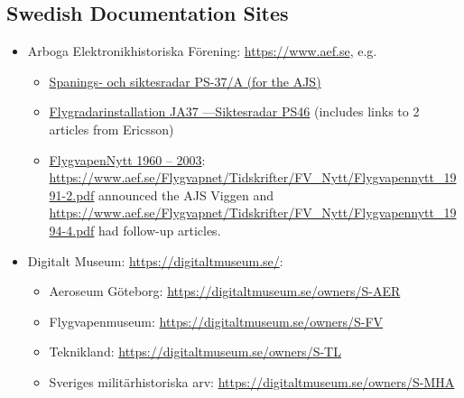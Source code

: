 \documentclass[a4paper]{report}
\begin{document}
\subsection{Swedish Documentation Sites}
\begin{itemize}
\item Arboga Elektronikhistoriska Förening: \url{https://www.aef.se}, e.g. 
\begin{itemize}
\item \href{https://www.aef.se/Avionik/Notiser/PS-37/PS-37A.htm}{Spanings- och siktesradar PS-37/A (for the AJS)}
\item \href{https://www.aef.se/Avionik/Notiser/Siktesradar_PS-46_1.htm}{Flygradarinstallation JA37 ---Siktesradar PS46} (includes links to 2 articles from Ericsson)
\item \href{https://www.aef.se/Flygvapnet/Tidskrifter/FV_Nytt/FVN_oversikt.htm}{FlygvapenNytt 1960 – 2003}: \url{https://www.aef.se/Flygvapnet/Tidskrifter/FV_Nytt/Flygvapennytt_1991-2.pdf} announced the AJS Viggen and \url{https://www.aef.se/Flygvapnet/Tidskrifter/FV_Nytt/Flygvapennytt_1994-4.pdf} had follow-up articles.
\end{itemize}
\item Digitalt Museum: \url{https://digitaltmuseum.se/}:
\begin{itemize}
\item Aeroseum Göteborg: \url{https://digitaltmuseum.se/owners/S-AER}
\item Flygvapenmuseum: \url{https://digitaltmuseum.se/owners/S-FV}
\item Teknikland: \url{https://digitaltmuseum.se/owners/S-TL}
\item Sveriges militärhistoriska arv: \url{https://digitaltmuseum.se/owners/S-MHA}
\end{itemize}
\end{itemize} 
\end{document}
